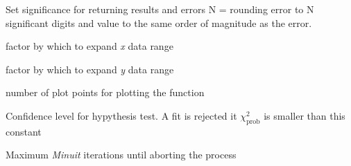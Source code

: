 \documentclass[a4paper,10pt,english]{sphinxmanual}
\begin{document}
\begin{fulllineitems}
\label{index:kafe.constants.F_SIGNIFICANCE}
Set significance for returning results and errors
N = rounding error to N significant digits and value
to the same order of magnitude as the error.

\end{fulllineitems}


\begin{fulllineitems}
\label{index:kafe.constants.G_PADDING_FACTOR_X}
factor by which to expand \emph{x} data range

\end{fulllineitems}


\begin{fulllineitems}
\label{index:kafe.constants.G_PADDING_FACTOR_Y}
factor by which to expand \emph{y} data range

\end{fulllineitems}


\begin{fulllineitems}
\label{index:kafe.constants.G_PLOT_POINTS}
number of plot points for plotting the function

\end{fulllineitems}


\begin{fulllineitems}
\label{index:kafe.constants.M_CONFIDENCE_LEVEL}
Confidence level for hypythesis test. A fit is rejected it $\chi^2_\text{prob}$ is smaller than this constant

\end{fulllineitems}


\begin{fulllineitems}
\label{index:kafe.constants.M_MAX_ITERATIONS}
Maximum \emph{Minuit} iterations until aborting the process

\end{fulllineitems}
\end{document}

